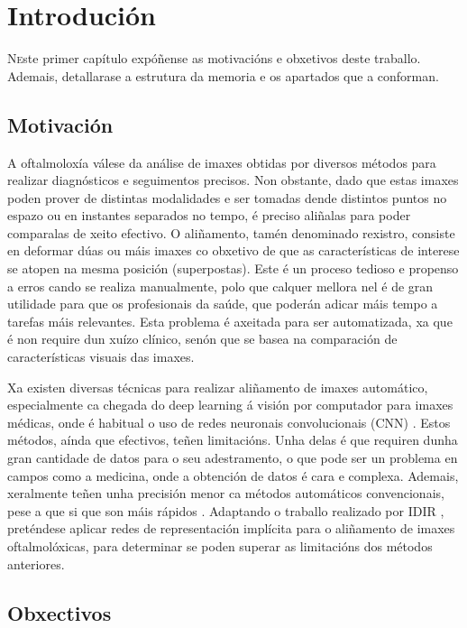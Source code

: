 \chapter{Introdución}
\label{chap:introducion}

\lettrine{N} este primer capítulo expóñense as motivacións e obxetivos deste traballo. Ademais, detallarase a estrutura da memoria e os apartados que a conforman.

\section{Motivación}
\label{sec:motivacion}

A oftalmoloxía válese da análise de imaxes obtidas por diversos métodos para realizar diagnósticos e seguimentos precisos.
Non obstante, dado que estas imaxes poden prover de distintas modalidades e ser tomadas dende distintos puntos no espazo ou en instantes separados no tempo, é preciso aliñalas para poder comparalas de xeito efectivo.
O aliñamento, tamén denominado rexistro, consiste en deformar dúas ou máis imaxes co obxetivo de que as características de interese se atopen na mesma posición (superpostas).
Este é un proceso tedioso e propenso a erros cando se realiza manualmente, polo que calquer mellora nel é de gran utilidade para que os profesionais da saúde, que poderán adicar máis tempo a tarefas máis relevantes.
Esta problema é axeitada para ser automatizada, xa que é non require dun xuízo clínico, senón que se basea na comparación de características visuais das imaxes.

Xa existen diversas técnicas para realizar aliñamento de imaxes automático, especialmente ca chegada do deep learning á visión por computador para imaxes médicas, onde é habitual o uso de redes neuronais convolucionais (\gls{CNN}) \cite{medicalimageanalysis}.
Estos métodos, aínda que efectivos, teñen limitacións. Unha delas é que requiren dunha gran cantidade de datos para o seu adestramento, o que pode ser un problema en campos como a medicina, onde a obtención de datos é cara e complexa. Ademais, xeralmente teñen unha precisión menor ca métodos automáticos convencionais, pese a que si que son máis rápidos \cite{bharati2022deeplearningmedicalimage}.
Adaptando o traballo realizado por IDIR \cite{wolterink2021implicit}, preténdese aplicar redes de representación implícita para o aliñamento de imaxes oftalmolóxicas, para determinar se poden superar as limitacións dos métodos anteriores.

\section{Obxectivos}

